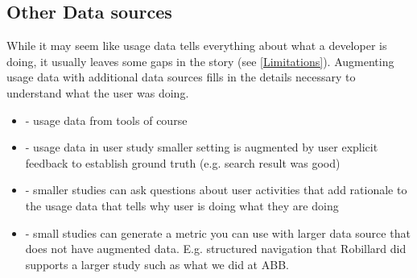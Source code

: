 \subsection{Other Data sources}

While it may seem like usage data tells everything about what a developer is doing, it usually leaves some gaps in the story (see \ref{Limitations}).  Augmenting usage data with additional data sources fills in the details necessary to understand what the user was doing.  
    \begin{itemize}
    \item
	- usage data from tools of course
\item
	- usage data in user study smaller setting is augmented by user explicit feedback to establish ground truth (e.g. search result was good)
\item
	- smaller studies can ask questions about user activities that add rationale to the usage data that tells why user is doing what they are doing
\item
	- small studies can generate a metric you can use with larger data source that does not have augmented data.  E.g. structured navigation that Robillard did supports a larger study such as what we did at ABB.
    \end{itemize}
    
